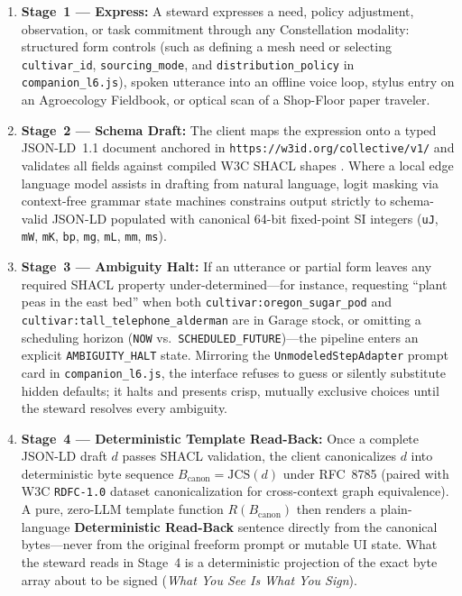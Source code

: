 \begin{enumerate}
  \item \textbf{Stage~1 --- Express:} A steward expresses a need, policy adjustment, observation, or task commitment through any Constellation modality: structured form controls (such as defining a mesh need or selecting \texttt{cultivar\_id}, \texttt{sourcing\_mode}, and \texttt{distribution\_policy} in \texttt{companion\_l6.js}), spoken utterance into an offline voice loop, stylus entry on an Agroecology Fieldbook, or optical scan of a Shop-Floor paper traveler.
  \item \textbf{Stage~2 --- Schema Draft:} The client maps the expression onto a typed JSON-LD~1.1 document \parencite{w3c2020jsonld} anchored in \texttt{https://w3id.org/collective/v1/} and validates all fields against compiled W3C SHACL shapes \parencite{w3c2017shacl}. Where a local edge language model assists in drafting from natural language, logit masking via context-free grammar state machines \parencite{willard2023outlines} constrains output strictly to schema-valid JSON-LD populated with canonical 64-bit fixed-point SI integers (\texttt{uJ}, \texttt{mW}, \texttt{mK}, \texttt{bp}, \texttt{mg}, \texttt{mL}, \texttt{mm}, \texttt{ms}).
  \item \textbf{Stage~3 --- Ambiguity Halt:} If an utterance or partial form leaves any required SHACL property under-determined---for instance, requesting ``plant peas in the east bed'' when both \texttt{cultivar:oregon\_sugar\_pod} and \texttt{cultivar:tall\_telephone\_alderman} are in Garage stock, or omitting a scheduling horizon (\texttt{NOW} vs.\ \texttt{SCHEDULED\_FUTURE})---the pipeline enters an explicit \texttt{AMBIGUITY\_HALT} state. Mirroring the \texttt{UnmodeledStepAdapter} prompt card in \texttt{companion\_l6.js}, the interface refuses to guess or silently substitute hidden defaults; it halts and presents crisp, mutually exclusive choices until the steward resolves every ambiguity.
  \item \textbf{Stage~4 --- Deterministic Template Read-Back:} Once a complete JSON-LD draft $d$ passes SHACL validation, the client canonicalizes $d$ into deterministic byte sequence $B_{\mathrm{canon}} = \mathrm{JCS}(d)$ under RFC~8785 \parencite{rfc8785} (paired with W3C \texttt{RDFC-1.0} dataset canonicalization \parencite{w3c2024rdfc} for cross-context graph equivalence). A pure, zero-LLM template function $R(B_{\mathrm{canon}})$ then renders a plain-language \textbf{Deterministic Read-Back} sentence directly from the canonical bytes---never from the original freeform prompt or mutable UI state. What the steward reads in Stage~4 is a deterministic projection of the exact byte array about to be signed (\textit{What You See Is What You Sign}).

\end{enumerate}
